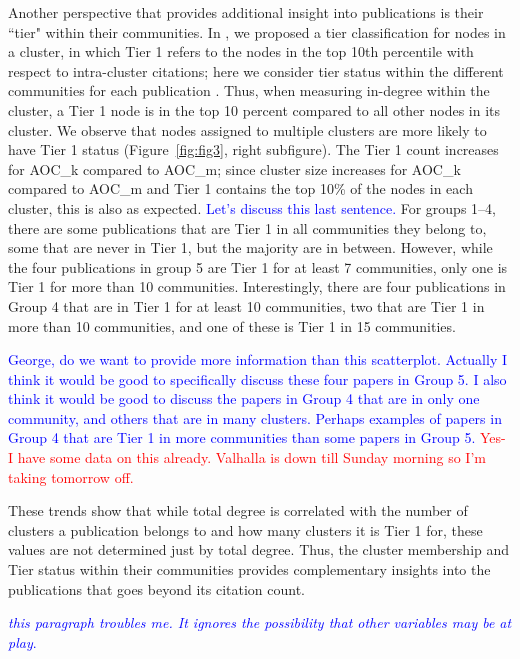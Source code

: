 \documentclass[12pt, oneside]{article}   	%
\begin{document}
	Another perspective that provides additional insight into publications is their ``tier" within their communities.
	In \cite{Chandrasekharan2021}, we  proposed a tier classification for nodes in a cluster, in which Tier 1 refers to the nodes in the top 10th percentile with respect to intra-cluster citations; here we consider tier status within the different communities for each publication .
	Thus, when measuring in-degree within the cluster, a Tier 1 node is in the top 10 percent compared to all other nodes in its cluster. 
	We observe that nodes assigned to multiple clusters are more likely to have Tier 1 status (Figure~\ref{fig:fig3}, right subfigure). The Tier 1 count increases for AOC\_k compared to AOC\_m; since cluster size  increases for AOC\_k compared to AOC\_m and Tier 1 contains the top 10\% of the nodes in each cluster, this is also as expected. \textcolor{blue}{Let's discuss this last sentence.}
	For groups 1--4, there are some publications that are Tier 1 in all communities they belong to, some that are never in Tier 1, but the majority are in between. 
	However, while the four publications in group 5 are Tier 1 for at least 7 communities, only one is Tier 1 for more than 10 communities. 
	Interestingly, there are four publications in Group 4 that are in Tier 1 for at least 10 communities, two that are Tier 1 in more than 10 communities, and one of these is Tier 1 in 15 communities.
	
	
	\textcolor{blue}{George, do we want to provide more information than this scatterplot. Actually I think it would be good to specifically discuss these four papers in Group 5. I also think it would be good to discuss the papers in Group 4 that are in only one community, and others that are in many clusters.  Perhaps examples of papers in Group 4 that are Tier 1 in more communities than some papers in Group 5.} \textcolor{red}{Yes- I have some data on this already. Valhalla is down till Sunday morning so I'm taking tomorrow off.}
	
	
	These trends show that while total degree is correlated with the number of clusters a publication belongs to and how many clusters it is Tier 1 for,
	these values are not determined just by total degree. Thus, the cluster membership and Tier status within their communities provides complementary insights into  the publications that goes beyond its citation count.
	
	\textcolor{blue}{ 
		\emph{this paragraph troubles me. It ignores the possibility that other variables may be at play}. }
	
\end{document}
